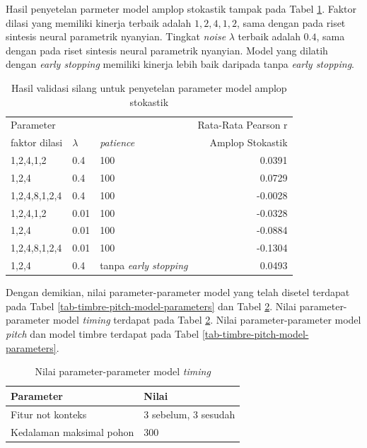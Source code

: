 Hasil penyetelan parmeter model amplop stokastik tampak pada Tabel \ref{tab-stoc-model-tuning-results}. Faktor dilasi yang memiliki kinerja terbaik adalah $1,2,4,1,2$, sama dengan pada riset sintesis neural parametrik nyanyian. Tingkat \textit{noise} $\lambda$ terbaik adalah $0.4$, sama dengan pada riset sintesis neural parametrik nyanyian. Model yang dilatih dengan \textit{early stopping} memiliki kinerja lebih baik daripada tanpa \textit{early stopping}.

\begin{table}[htbp]
    \centering
    \caption{Hasil validasi silang untuk penyetelan parameter model amplop stokastik}\label{tab-stoc-model-tuning-results}
    \begin{tabular}{ |l|l|l|r| } 
     \hline
     \multicolumn{3}{|l|}{Parameter} & Rata-Rata Pearson r\\
     \cline{1-3}
     faktor dilasi & $\lambda$ & \textit{patience} & Amplop Stokastik\\
	 \hline 
	1,2,4,1,2& 0.4& 100           & 0.0391\\\hline
	1,2,4& 0.4& 100               & 0.0729\\\hline
	1,2,4,8,1,2,4& 0.4& 100       &-0.0028\\\hline
	1,2,4,1,2& 0.01& 100          &-0.0328\\\hline
	1,2,4& 0.01& 100              &-0.0884\\\hline
	1,2,4,8,1,2,4& 0.01& 100      &-0.1304\\\hline
	1,2,4& 0.4& tanpa \textit{early stopping}       & 0.0493\\\hline
    \end{tabular}
\end{table}

Dengan demikian, nilai parameter-parameter model yang telah disetel terdapat pada Tabel \ref{tab-timbre-pitch-model-parameters} dan Tabel \ref{tab-timing-model-parameters}. Nilai parameter-parameter model \textit{timing} terdapat pada Tabel \ref{tab-timing-model-parameters}. Nilai parameter-parameter model \textit{pitch} dan model timbre terdapat pada Tabel \ref{tab-timbre-pitch-model-parameters}.
\begin{table}[htbp]
	\centering
	\caption{Nilai parameter-parameter model \textit{timing}}\label{tab-timing-model-parameters}
	\begin{tabular}{|l|l|}
	\hline
	Parameter&Nilai \\\hline
	Fitur not konteks & 3 sebelum, 3 sesudah\\\hline
	Kedalaman maksimal pohon & 300\\\hline
	\end{tabular}
\end{table}


